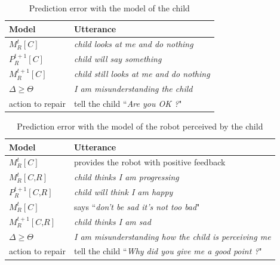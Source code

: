 \documentclass[10pt,a4paper]{article}
\begin{document}
\begin{table}
\centering
\renewcommand{\arraystretch}{1.5}
\begin{tabular}{|l|l|}
\hline
\textbf{Model} & \textbf{Utterance}\\
\hline
$M^t_R\left[\textit{C}\right]$ & \textit{child looks at me and do nothing}\\
\hline
$P^{t+1}_R\left[\textit{C}\right]$ & \textit{child will say something}\\
\hline
$M^{t+1}_R\left[\textit{C}\right]$ & \textit{child still looks at me and do nothing}\\
\hline
$\Delta \geq \Theta$ & \textit{I am misunderstanding the child}\\
\hline
action to repair & tell the child ``\textit{Are you OK ?}"\\
\hline
\end{tabular}
\caption{Prediction error with the model of the child}
\label{pred_child}
\end{table}

\begin{table}
\centering
\renewcommand{\arraystretch}{1.5}
\begin{tabular}{|l|l|}
\hline
\textbf{Model} & \textbf{Utterance}\\
\hline
$M^{t}_R\left[\textit{C}\right]$ & provides the robot with positive feedback\\
\hline
$M^t_R\left[\textit{C,R}\right]$ & \textit{child thinks I am progressing}\\
\hline
$P^{t+1}_R\left[\textit{C,R}\right]$ & \textit{child will think I am happy}\\
\hline
$M^{t}_R\left[\textit{C}\right]$ & says ``\textit{don't be sad it's not too bad}"\\
\hline
$M^{t+1}_R\left[\textit{C,R}\right]$ & \textit{child thinks I am sad}\\
\hline
$\Delta \geq \Theta$ & \textit{I am misunderstanding how the child is perceiving me}\\
\hline
action to repair & tell the child ``\textit{Why did you give me a good point ?}"\\
\hline
\end{tabular}
\caption{Prediction error with the model of the robot perceived by the child}
\label{pred_cr}
\end{table}
\end{document}
